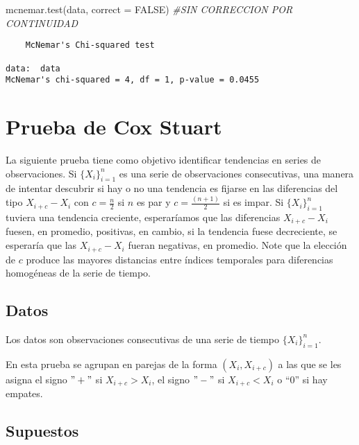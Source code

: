 \documentclass[
  a4paper,
  oneside,
  openany]{book}
\newenvironment{Shaded}{\begin{snugshade}}{\end{snugshade}}
\newcommand{\AttributeTok}[1]{\textcolor[rgb]{0.77,0.63,0.00}{#1}}
\newcommand{\CommentTok}[1]{\textcolor[rgb]{0.56,0.35,0.01}{\textit{#1}}}
\newcommand{\ConstantTok}[1]{\textcolor[rgb]{0.00,0.00,0.00}{#1}}
\newcommand{\FunctionTok}[1]{\textcolor[rgb]{0.00,0.00,0.00}{#1}}
\newcommand{\NormalTok}[1]{#1}
\begin{document}
\begin{Shaded}
\begin{Highlighting}[]
\FunctionTok{mcnemar.test}\NormalTok{(data, }\AttributeTok{correct =} \ConstantTok{FALSE}\NormalTok{) }\CommentTok{\#SIN CORRECCION POR CONTINUIDAD}
\end{Highlighting}
\end{Shaded}

\begin{verbatim}
    McNemar's Chi-squared test

data:  data
McNemar's chi-squared = 4, df = 1, p-value = 0.0455
\end{verbatim}

\hypertarget{prueba-de-cox-stuart}{%
\chapter{Prueba de Cox Stuart}\label{prueba-de-cox-stuart}}

La siguiente prueba tiene como objetivo identificar tendencias en series de observaciones.
Si \(\{X_{i}\}^{n}_{i=1}\) es una serie de observaciones consecutivas, una manera de
intentar descubrir si hay o no una tendencia es fijarse en las diferencias del tipo \(X_{i+c} - X_{i}\) con \(c = \frac{n}{2}\) si \(n\) es par y \(c =\frac{(n + 1)}{2}\) si es impar.
Si \(\{X_{i}\}^{n}_{i=1}\) tuviera una tendencia creciente, esperaríamos que las diferencias \(X_{i+c} - X_{i}\) fuesen, en promedio, positivas, en cambio, si la tendencia fuese decreciente, se esperaría que las \(X_{i+c} - X_{i}\) fueran negativas, en promedio.
Note que la elección de \(c\) produce las mayores distancias entre índices temporales para diferencias homogéneas de la serie de tiempo.

\hypertarget{datos-4}{%
\section{Datos}\label{datos-4}}

Los datos son observaciones consecutivas de una serie de tiempo \(\{X_{i}\}^{n}_{i=1}\).

En esta prueba se agrupan en parejas de la forma \((X_{i},X_{i+c})\) a las que se les asigna el signo \("+"\) si \(X_{i+c} > X_{i}\), el signo \("-"\) si \(X_{i+c} < X_{i}\) o ``0'' si hay empates.

\hypertarget{supuestos-4}{%
\section{Supuestos}\label{supuestos-4}}
\end{document}
